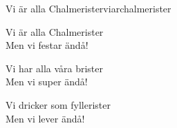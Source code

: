 \begin{song}{Vi är alla Chalmerister}{viarchalmerister}
\begin{vers}
\repopen Vi är alla Chalmerister \repclose\\
Men vi festar ändå!\\
\end{vers}
\begin{vers}
\repopen Vi har alla våra brister \repclose\\
Men vi super ändå!\\
\end{vers}
\begin{vers}
\repopen Vi dricker som fyllerister \repclose\\
Men vi lever ändå!\\
\end{vers}
\end{song}